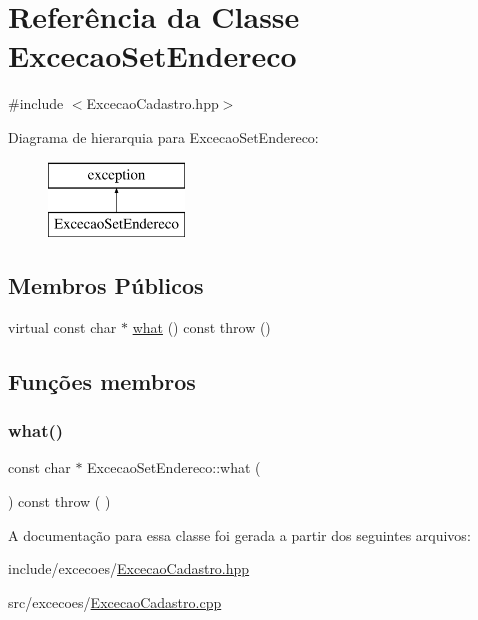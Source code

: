 \hypertarget{class_excecao_set_endereco}{}\section{Referência da Classe Excecao\+Set\+Endereco}
\label{class_excecao_set_endereco}


{\ttfamily \#include $<$Excecao\+Cadastro.\+hpp$>$}

Diagrama de hierarquia para Excecao\+Set\+Endereco\+:\begin{figure}[H]
\begin{center}
\leavevmode
\includegraphics[height=2.000000cm]{class_excecao_set_endereco}
\end{center}
\end{figure}
\subsection*{Membros Públicos}
\begin{DoxyCompactItemize}
\item 
virtual const char $\ast$ \mbox{\hyperlink{class_excecao_set_endereco_a1206df87449b784059de0fa6b8d7f098}{what}} () const  throw ()
\end{DoxyCompactItemize}


\subsection{Funções membros}
\mbox{\label{class_excecao_set_endereco_a1206df87449b784059de0fa6b8d7f098}} 
\subsubsection{\texorpdfstring{what()}{what()}}
{\footnotesize\ttfamily const char $\ast$ Excecao\+Set\+Endereco\+::what (\begin{DoxyParamCaption}{ }\end{DoxyParamCaption}) const throw ( ) \hspace{0.3cm}{\ttfamily [virtual]}}



A documentação para essa classe foi gerada a partir dos seguintes arquivos\+:\begin{DoxyCompactItemize}
\item 
include/excecoes/\mbox{\hyperlink{_excecao_cadastro_8hpp}{Excecao\+Cadastro.\+hpp}}\item 
src/excecoes/\mbox{\hyperlink{_excecao_cadastro_8cpp}{Excecao\+Cadastro.\+cpp}}\end{DoxyCompactItemize}

